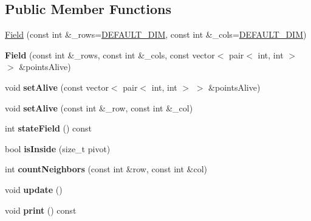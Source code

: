 \subsection*{Public Member Functions}
\begin{DoxyCompactItemize}
\item 
\hyperlink{classField_a9db14b333489e7cb486b1d06631aa3ea}{Field} (const int \&\+\_\+rows=\hyperlink{classField_add3cd7850a250739b0eb08caf41427da}{D\+E\+F\+A\+U\+L\+T\+\_\+\+D\+IM}, const int \&\+\_\+cols=\hyperlink{classField_add3cd7850a250739b0eb08caf41427da}{D\+E\+F\+A\+U\+L\+T\+\_\+\+D\+IM})
\item 
{\bfseries Field} (const int \&\+\_\+rows, const int \&\+\_\+cols, const vector$<$ pair$<$ int, int $>$ $>$ \&points\+Alive)\hypertarget{classField_aa87243f12c97d3a861cbeeee9ad6d8c7}{}\label{classField_aa87243f12c97d3a861cbeeee9ad6d8c7}

\item 
void {\bfseries set\+Alive} (const vector$<$ pair$<$ int, int $>$ $>$ \&points\+Alive)\hypertarget{classField_abb2ec476cd400e9c2e3fea4c502738de}{}\label{classField_abb2ec476cd400e9c2e3fea4c502738de}

\item 
void {\bfseries set\+Alive} (const int \&\+\_\+row, const int \&\+\_\+col)\hypertarget{classField_ae7feca864aadf6aceba260cc6aee64b0}{}\label{classField_ae7feca864aadf6aceba260cc6aee64b0}

\item 
int {\bfseries state\+Field} () const \hypertarget{classField_ab4bf046987359d627f8583c3d4ae3c62}{}\label{classField_ab4bf046987359d627f8583c3d4ae3c62}

\item 
bool {\bfseries is\+Inside} (size\+\_\+t pivot)\hypertarget{classField_a404555b889668199df5e5aa52270a3b1}{}\label{classField_a404555b889668199df5e5aa52270a3b1}

\item 
int {\bfseries count\+Neighbors} (const int \&row, const int \&col)\hypertarget{classField_a8cf89a674edccb691fb3a61375fe7c68}{}\label{classField_a8cf89a674edccb691fb3a61375fe7c68}

\item 
void {\bfseries update} ()\hypertarget{classField_af48801e4d3d1b92ba7c094132fb56cb3}{}\label{classField_af48801e4d3d1b92ba7c094132fb56cb3}

\item 
void {\bfseries print} () const \hypertarget{classField_ae1faecba43b9fb78e8662ec589ee00aa}{}\label{classField_ae1faecba43b9fb78e8662ec589ee00aa}


\end{DoxyCompactItemize}

